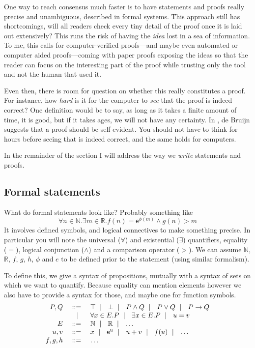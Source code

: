 One way to reach consensus much faster is to have statements and proofs really
precise and unambiguous, described in formal systems. This approach still has
shortcomings, will all readers check every tiny detail of the proof once it is
laid out extensively? This runs the risk of having the \emph{idea} lost in a
sea of information.
To me, this calls for computer-verified proofs---and maybe even automated or
computer aided proofs---coming with paper proofs exposing the ideas
so that the reader can focus on the interesting part of
the proof while trusting only the tool and not the human that used it.

Even then, there is room for question on whether this really constitutes a
proof.
For instance, how \emph{hard} is it for the computer to \emph{see} that the
proof is indeed correct? One definition would be to say, as long as it takes
a finite amount of time, it is good, but if it takes ages, we will not have any
certainty. In , de Bruijn suggests that a proof should be
self-evident. You should not have to think for hours before seeing that is
indeed correct, and the same holds for computers.

In the remainder of the section I will address the way we \emph{write}
statements and proofs.

\subsection{Formal statements}

What do formal statements look like? Probably something like
\[
  \forall n \in \mathbb{N}. \exists m \in \mathbb{R}.
  f(n) = \mathsf{e}^{\phi(m)} \wedge g(n) > m
\]
It involves defined symbols, and logical connectives to make something precise.
In particular you will note the universal (\(\forall\)) and existential
(\(\exists\)) quantifiers, equality (\(=\)), logical conjunction (\(\wedge\))
and a comparison operator (\(>\)).
We can assume \(\mathbb{N}\), \(\mathbb{R}\), \(f\), \(g\), \(h\), \(\phi\) and
\(e\) to be defined prior to the statement (using similar formalism).

To define this, we give a syntax of propositions, mutually with a syntax of
sets on which we want to quantify. Because equality can mention elements however
we also have to provide a syntax for those, and maybe one for function symbols.
\[
  \begin{array}{rrl}
    P, Q &\ \mathrel{{:}{:}{=}}\ & \top \ \mid\ \  \bot \ \mid\ \  P \wedge Q \ \mid\ \  P \vee Q
    \ \mid\ \  P \to Q \\
    &\ \mid\ \ & \forall x \in E. P \ \mid\ \  \exists x \in E. P \ \mid\ \  u = v \\
    E &\ \mathrel{{:}{:}{=}}\ & \mathbb{N} \ \mid\ \  \mathbb{R} \ \mid\ \  \dots \\
    u, v &\ \mathrel{{:}{:}{=}}\ & x \ \mid\ \  \mathsf{e}^u \ \mid\ \  u + v \ \mid\ \  f(u) \ \mid\ \  \dots \\
    f, g, h &\ \mathrel{{:}{:}{=}}\ & \dots
  \end{array}
\]

